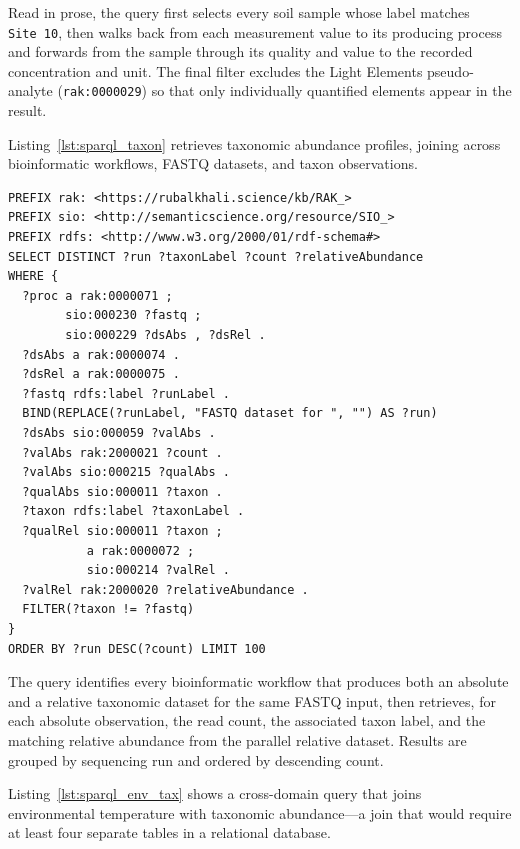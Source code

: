 \documentclass[11pt,a4paper]{article}
\begin{document}
Read in prose, the query first selects every soil sample whose label
matches \texttt{Site~10}, then walks back from each measurement value
to its producing process and forwards from the sample through its
quality and value to the recorded concentration and unit. The final
filter excludes the Light Elements pseudo-analyte
(\texttt{rak:0000029}) so that only individually quantified elements
appear in the result.

Listing~\ref{lst:sparql_taxon} retrieves taxonomic abundance
profiles, joining across bioinformatic workflows, FASTQ datasets,
and taxon observations.

\begin{lstlisting}[caption={SPARQL query to retrieve taxonomic
    composition and abundance for all samples.},
  label={lst:sparql_taxon}, basicstyle=\ttfamily\scriptsize, frame=single]
PREFIX rak: <https://rubalkhali.science/kb/RAK_>
PREFIX sio: <http://semanticscience.org/resource/SIO_>
PREFIX rdfs: <http://www.w3.org/2000/01/rdf-schema#>
SELECT DISTINCT ?run ?taxonLabel ?count ?relativeAbundance
WHERE {
  ?proc a rak:0000071 ;
        sio:000230 ?fastq ;
        sio:000229 ?dsAbs , ?dsRel .
  ?dsAbs a rak:0000074 .
  ?dsRel a rak:0000075 .
  ?fastq rdfs:label ?runLabel .
  BIND(REPLACE(?runLabel, "FASTQ dataset for ", "") AS ?run)
  ?dsAbs sio:000059 ?valAbs .
  ?valAbs rak:2000021 ?count .
  ?valAbs sio:000215 ?qualAbs .
  ?qualAbs sio:000011 ?taxon .
  ?taxon rdfs:label ?taxonLabel .
  ?qualRel sio:000011 ?taxon ;
           a rak:0000072 ;
           sio:000214 ?valRel .
  ?valRel rak:2000020 ?relativeAbundance .
  FILTER(?taxon != ?fastq)
}
ORDER BY ?run DESC(?count) LIMIT 100
\end{lstlisting}

The query identifies every bioinformatic workflow that produces both
an absolute and a relative taxonomic dataset for the same FASTQ
input, then retrieves, for each absolute observation, the read count,
the associated taxon label, and the matching relative abundance from
the parallel relative dataset. Results are grouped by sequencing run
and ordered by descending count.

Listing~\ref{lst:sparql_env_tax} shows a cross-domain query that
joins environmental temperature with taxonomic abundance---a join
that would require at least four separate tables in a relational
database.
\end{document}
